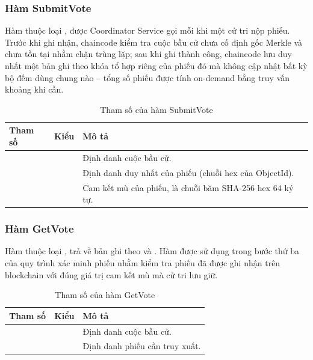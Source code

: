 \subsubsection{Hàm SubmitVote}

Hàm  thuộc loại , được Coordinator Service gọi mỗi khi một cử tri nộp phiếu. Trước khi ghi nhận, chaincode kiểm tra cuộc bầu cử chưa cố định gốc Merkle và  chưa tồn tại nhằm chặn trùng lặp; sau khi ghi thành công, chaincode lưu duy nhất một bản ghi  theo khóa tổ hợp riêng của phiếu đó mà không cập nhật bất kỳ bộ đếm dùng chung nào -- tổng số phiếu được tính on-demand bằng truy vấn khoảng khi cần.

\begin{table}[H]
    \centering
    \small
    \setlength{\tabcolsep}{3pt}
    \caption{Tham số của hàm SubmitVote}
    \label{tab:cc-submitvote}
    \begin{tabularx}{\textwidth}{|L{0.25}|L{0.25}|L{0.50}|}
    \hline
    \textbf{Tham số} & \textbf{Kiểu} & \textbf{Mô tả} \\
    \hline
            &  & Định danh cuộc bầu cử. \\ \hline
                &  & Định danh duy nhất của phiếu (chuỗi hex của ObjectId). \\ \hline
     &  & Cam kết mù của phiếu, là chuỗi băm SHA-256 hex 64 ký tự. \\ \hline
    \end{tabularx}
\end{table}

\subsubsection{Hàm GetVote}

Hàm  thuộc loại , trả về bản ghi  theo  và . Hàm được sử dụng trong bước thứ ba của quy trình xác minh phiếu nhằm kiểm tra phiếu đã được ghi nhận trên blockchain với đúng giá trị cam kết mù mà cử tri lưu giữ.

\begin{table}[H]
    \centering
    \small
    \setlength{\tabcolsep}{3pt}
    \caption{Tham số của hàm GetVote}
    \label{tab:cc-getvote}
    \begin{tabularx}{\textwidth}{|L{0.25}|L{0.25}|L{0.50}|}
    \hline
    \textbf{Tham số} & \textbf{Kiểu} & \textbf{Mô tả} \\
    \hline
     &  & Định danh cuộc bầu cử. \\ \hline
         &  & Định danh phiếu cần truy xuất. \\ \hline
    \end{tabularx}
\end{table}

